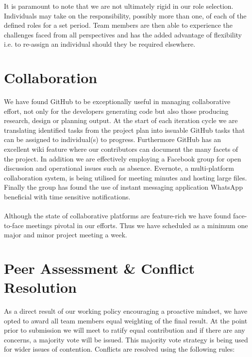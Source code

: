 \documentclass[11pt,a4paper]{article}
\begin{document}
It is paramount to note that we are not ultimately rigid in our role selection.  Individuals may take on the responsibility, possibly more than one, of each of the defined roles for a set period.  Team members are then able to experience the challenges faced from all perspectives and has the added advantage of flexibility i.e. to re-assign an individual should they be required elsewhere.

\section{Collaboration}
\paragraph{}
We have found GitHub to be exceptionally useful in managing collaborative effort, not only for the developers generating code but also those producing research, design or planning output.  At the start of each iteration cycle we are translating identified tasks from the project plan into issuable GitHub tasks that can be assigned to individual(s) to progress.  Furthermore GitHub has an excellent wiki feature where our contributors can document the many facets of the project.
\newline
In addition we are effectively employing a Facebook group for open discussion and operational issues such as absence.  Evernote, a multi-platform collaboration system, is being utilised for meeting minutes and hosting large files.  Finally the group has found the use of instant messaging application WhatsApp beneficial with time sensitive notifications.
\paragraph{}
Although the state of collaborative platforms are feature-rich we have found face-to-face meetings pivotal in our efforts.  Thus we have scheduled as a minimum one major and minor project meeting a week.

\section{Peer Assessment \& Conflict Resolution}
\paragraph{}
As a direct result of our working policy encouraging a proactive mindset, we have opted to award all team members equal weighting of the final result.  At the point prior to submission we will meet to ratify equal contribution and if there are any concerns, a majority vote will be issued.
This majority vote strategy is being used for wider issues of contention.  Conflicts are resolved using the following rules:
\end{document}
